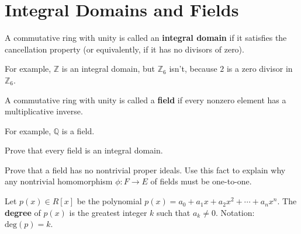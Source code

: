 \section{Integral Domains and Fields}

\begin{definition}
A commutative ring with unity is called an \textbf{integral domain} if it satisfies the cancellation property (or equivalently, if it has no divisors of zero).
\end{definition}

For example, \(\mathbb{Z}\) is an integral domain, but \(\mathbb{Z}_6\) isn't, because \(2\) is a zero divisor in \(\mathbb{Z}_6\).

\begin{definition}
A commutative ring with unity is called a \textbf{field} if every nonzero element has a multiplicative inverse.
\end{definition}

For example, \(\mathbb{Q}\) is a field.
\begin{annotation}
\end{annotation}

\begin{problem}
Prove that every field is an integral domain.
\end{problem}

\begin{problem}\label{prob:noideal}
Prove that a field has no nontrivial proper ideals. Use this fact to explain why any nontrivial homomorphism \(\phi: F \longrightarrow E\) of fields must be one-to-one.
\begin{annotation}
\end{annotation}
\end{problem}

\begin{definition}
Let \(p(x) \in R[x]\) be the polynomial \(p(x) = a_0 + a_1x + a_2x^2 + \cdots + a_nx^n \). The \textbf{degree} of \(p(x)\) is the greatest integer \(k\) such that \(a_k \neq 0\). Notation: \(\mbox{deg} (p) = k\).
\end{definition}

